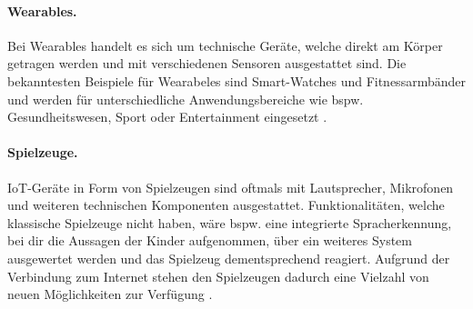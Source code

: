 \paragraph{Wearables.}
Bei Wearables handelt es sich um technische Geräte, welche direkt am Körper
getragen werden und mit verschiedenen Sensoren ausgestattet sind. Die
bekanntesten Beispiele für Wearabeles sind Smart-Watches und Fitnessarmbänder
und werden für unterschiedliche Anwendungsbereiche wie bspw. Gesundheitswesen,
Sport oder Entertainment eingesetzt \cite{paper}.

\paragraph{Spielzeuge.}
IoT-Geräte in Form von Spielzeugen sind oftmals mit Lautsprecher, Mikrofonen und
weiteren technischen Komponenten ausgestattet.  Funktionalitäten, welche
klassische Spielzeuge nicht haben, wäre bspw. eine integrierte Spracherkennung,
bei dir die Aussagen der Kinder aufgenommen, über ein weiteres System
ausgewertet werden und das Spielzeug dementsprechend reagiert. Aufgrund der
Verbindung zum Internet stehen den Spielzeugen dadurch eine Vielzahl von neuen
Möglichkeiten zur Verfügung \cite{paper}.
